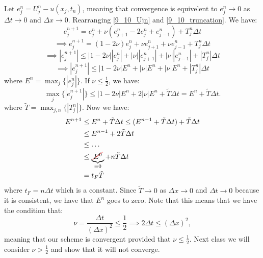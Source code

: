 \documentclass[../main/main.tex]{subfiles}
\begin{document}
Let $e_j^n = U_j^n - u(x_j,t_n)$, meaning that convergence is equivelent to $e_j^{n} \to  0 $ as $\Delta t \to  0$ and $\Delta x \to  0$. Rearranging \ref{9_10_Ujn} and \ref{9_10_truncation}.
We have: \[
    e_j^{n+1} = e_j^n + \nu \left( e_{j+1}^n - 2 e_j^n + e_{j-1}^n \right) + T_j^n \Delta t 
\] \[
\implies e_j^{n+1} = (1-2\nu)e_j^n + \nu e_{j+1}^n + \nu e_{j-1}^n + T_j^n \Delta t
\] \[
\implies |e_j^{n+1}| \le  |1-2\nu| |e_j^n| + |\nu| |e_{j+1}^{n}| + |\nu | | e_{j-1}^n| + |T^n_j| \Delta t 
\] 
\[
    \implies |e_j^{n+1}| \le 
|1-2\nu| E^n + |\nu| E^n + |\nu | E^n + |T^n_j| \Delta t 
\] 
where $ E^n = \max_j \{|e_j^n|\} .$ If $\nu\le \frac{1}{2}$, we have: \[
    \max_j \{|e^{n+1}_j|\} \le  |1-2\nu| E^{n} + 2|\nu| E^{n} + \tilde{T} \Delta t = E^{n} + \tilde{T} \Delta t
.\] where $\tilde{T} = \max _{j, n} \{|T_j^n|\} $. Now we have:
\begin{align*}
    E^{n+1} &\le  E^n + \tilde{T} \Delta t \le  (E^{n-1} + \tilde{T} \Delta t) + \tilde{T} \Delta t   \\
            &\le  E^{n-1} + 2 \tilde{T} \Delta t \\
            &\le \ldots\\
            &\le  \underbrace{\Ccancel[red]{E^0}}_{=0} + n \tilde{T} \Delta t\\
            &= t_F\tilde{T} 
\end{align*}
where $t_F=n \Delta t$ which is a constant.
Since $\tilde{T} \to  0$ as $\Delta x\to  0$ and $\Delta t \to  0$ because it is consistent, we have that $E^{n}$ goes to zero.  Note that this means that we have the condition that: \[
    \nu = \frac{\Delta t}{(\Delta x)^2} \le  \frac{1}{2} \implies 2\Delta t \le (\Delta x)^2
,\] meaning that our scheme is convergent provided that $\nu \le  \frac{1}{2}$. Next class we will consider $\nu > \frac{1}{2}$ and show that it will not converge.
\end{document}
